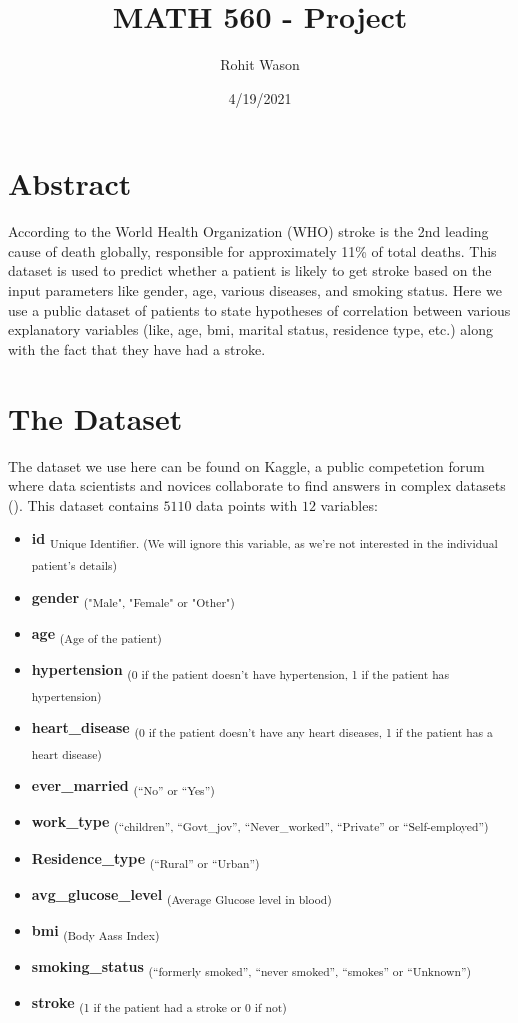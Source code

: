 \documentclass{article}
\author{Rohit Wason}
\title{MATH 560 - Project}
\date{4/19/2021}
\begin{document}
\maketitle

\section*{Abstract}
According to the World Health Organization (WHO) stroke is the 2nd leading cause of death globally, 
responsible for approximately 11\% of total deaths. This dataset is used to predict whether a patient
is likely to get stroke based on the input parameters like gender, age, various diseases, and smoking 
status. Here we use a public dataset of patients to state hypotheses of correlation between various explanatory
variables (like, age, bmi, marital status, residence type, etc.) along with the fact that they have had
a stroke.\\
\pagebreak

\section*{The Dataset}
The dataset we use here can be found on Kaggle, a public competetion forum
where data scientists and novices collaborate to find answers in complex datasets
(\cite{kaggle}). This dataset contains $5110$ data points with $12$ variables:
\begin{itemize}
  \item \textbf{id}
    \textsubscript{Unique Identifier. (We will ignore this variable, as we're not interested in the individual patient's details)}
  \item \textbf{gender}
    \textsubscript{("Male", "Female" or "Other")}
  \item \textbf{age}
    \textsubscript{(Age of the patient)}
  \item \textbf{hypertension}
    \textsubscript{(0 if the patient doesn't have hypertension, 1 if the patient has hypertension)}
  \item \textbf{heart\_disease} 
    \textsubscript{(0 if the patient doesn't have any heart diseases, 1 if the patient has a heart disease)}
  \item \textbf{ever\_married} 
    \textsubscript{(``No'' or ``Yes'')}
  \item \textbf{work\_type} 
    \textsubscript{(``children'', ``Govt\_jov'', ``Never\_worked'', ``Private'' or ``Self-employed'')}
  \item \textbf{Residence\_type} 
    \textsubscript{(``Rural'' or ``Urban'')}
  \item \textbf{avg\_glucose\_level} 
    \textsubscript{(Average Glucose level in blood)}
  \item \textbf{bmi} 
    \textsubscript{(Body Aass Index)}
  \item \textbf{smoking\_status} 
    \textsubscript{(``formerly smoked'', ``never smoked'', ``smokes'' or ``Unknown'')}
  \item \textbf{stroke} 
    \textsubscript{(1 if the patient had a stroke or 0 if not)}
\end{itemize}
\pagebreak
\end{document}

